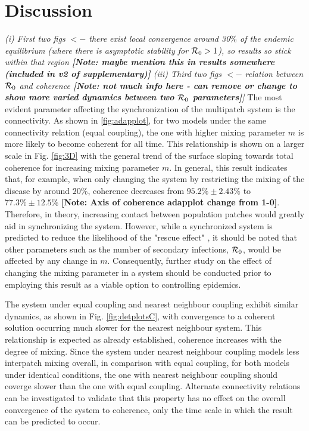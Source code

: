 \documentclass[twocolumn,nofootinbib,showkeys,twoside,floatfix,unsortedaddress,flushbottom,10pt,aps,pra]{report}
\begin{document}
\section{Discussion} 
\textit{(i) First two figs $<-$ there exist local convergence around 30$\%$ of the endemic equilibrium (where there is asymptotic stability for ${\cal R}_0 > 1$), so results so stick within that region \textbf{[Note: maybe mention this in results somewhere (included in v2 of supplementary)]}
(iii) Third two figs $<-$ relation between ${\cal R}_0$ and coherence \textbf{[Note: not much info here - can remove or change to show more varied dynamics between two ${\cal R}_0$ parameters]}]}
\bigskip
The most evident parameter affecting the synchronization of the multipatch system is the connectivity. As shown in \ref{fig:adapplot}, for two models under the same connectivity relation (equal coupling), the one with higher mixing parameter $m$ is more likely to become coherent for all time. This relationship is shown on a larger scale in Fig. \ref{fig:3D} with the general trend of the surface sloping towards total coherence for increasing mixing parameter $m$. In general, this result indicates that, for example, when only changing the system by restricting the mixing of the disease by around $20\%$, coherence decreases from $95.2\%\pm2.43\%$ to $77.3\%\pm12.5\%$ \textbf{[Note: Axis of coherence adapplot change from 1-0]}. Therefore, in theory, increasing contact between population patches would greatly aid in synchronizing the system. However, while a synchronized system is predicted to reduce the likelihood of the "rescue effect" \cite{Earn2000}, it should be noted that other parameters such as the number of secondary infections, ${\cal R}_0$, would be affected by any change in $m$. Consequently, further study on the effect of changing the mixing parameter in a system should be conducted prior to employing this result as a viable option to controlling epidemics. \par \smallskip \qquad
The system under equal coupling and nearest neighbour coupling exhibit similar dynamics, as shown in Fig. \ref{fig:detplotsC}, with convergence to a coherent solution occurring much slower for the nearest neighbour system. This relationship is expected as already established, coherence increases with the degree of mixing. Since the system under nearest neighbour coupling models less interpatch mixing overall, in comparison with equal coupling, for both models under identical conditions, the one with nearest neighbour coupling should coverge slower than the one with equal coupling. Alternate connectivity relations can be investigated to validate that this property has no effect on the overall convergence of the system to coherence, only the time scale in which the result can be predicted to occur. \par \smallskip \qquad
\end{document}
